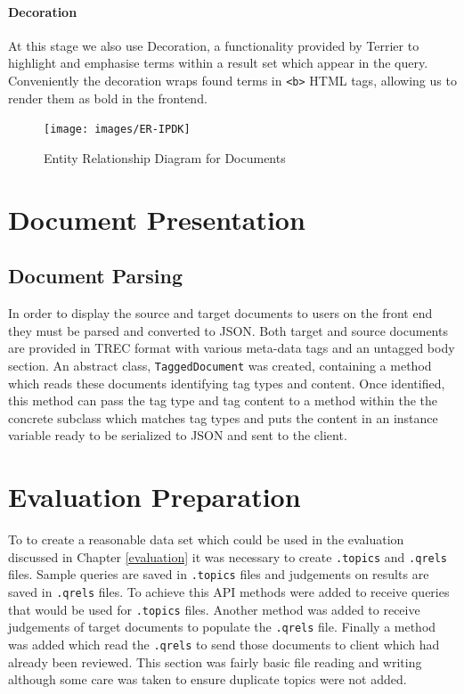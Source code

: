 \documentclass{l4proj}
\newcommand{\code}[1]{\texttt{#1}}
\begin{document}
\paragraph{Decoration} \label{server_decoration}
At this stage we also use Decoration, a functionality provided by Terrier to highlight and emphasise terms within a result set which appear in the query. Conveniently the decoration wraps found terms in \code{<b>} HTML tags, allowing us to render them as bold in the frontend.

\begin{figure}[H]
\centering
\texttt{[image: images/ER-IPDK]}
\caption{Entity Relationship Diagram for Documents}
\label{er}
\end{figure}

\section{Document Presentation}
\subsection{Document Parsing} \label{docparse}
In order to display the source and target documents to users on the front end they must be parsed and converted to JSON.
Both target and source documents are provided in TREC format with various meta-data tags and an untagged body section.
An abstract class, \code{TaggedDocument} was created, containing a method which reads these documents identifying tag types and content. Once identified, this method can pass the tag type and tag content to a method within the the concrete subclass which matches tag types and puts the content in an instance variable ready to be serialized to JSON and sent to the client.

\section{Evaluation Preparation}
To to create a reasonable data set which could be used in the evaluation discussed in Chapter \ref{evaluation} it was necessary to create \code{.topics} and \code{.qrels} files. Sample queries are saved in \code{.topics} files and judgements on results are saved in \code{.qrels} files.
To achieve this API methods were added to receive queries that would be used for \code{.topics} files. Another method was added to receive judgements of target documents to populate the \code{.qrels} file. Finally a method was added which read the \code{.qrels} to send those documents to client which had already been reviewed.
This section was fairly basic file reading and writing although some care was taken to ensure duplicate topics were not added.
\end{document}
